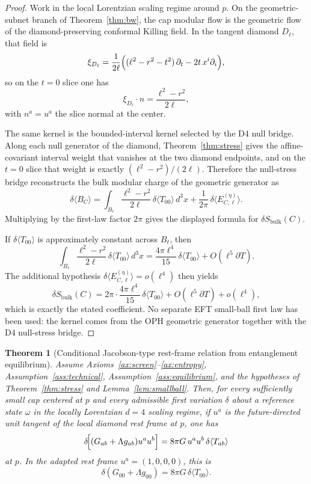 \documentclass[11pt]{article}
\newtheorem{theorem}{Theorem}[section]
\begin{document}
\begin{proof}
Work in the local Lorentzian scaling regime around $p$. On the geometric-subnet branch of Theorem~\ref{thm:bw}, the cap modular flow is the geometric flow of the diamond-preserving conformal Killing field. In the tangent diamond $D_\ell$, that field is
\[
\xi_{D_\ell}
=
\frac{1}{2\ell}
\Bigl((\ell^2-r^2-t^2)\,\partial_t-2t\,x^i\partial_i\Bigr),
\]
so on the $t=0$ slice one has
\[
\xi_{D_\ell}\!\cdot n=\frac{\ell^2-r^2}{2\ell},
\]
with $n^a=u^a$ the slice normal at the center.

The same kernel is the bounded-interval kernel selected by the D4 null bridge. Along each null generator of the diamond, Theorem~\ref{thm:stress} gives the affine-covariant interval weight that vanishes at the two diamond endpoints, and on the $t=0$ slice that weight is exactly $(\ell^2-r^2)/(2\ell)$. Therefore the null-stress bridge reconstructs the bulk modular charge of the geometric generator as
\[
\delta\langle B_C\rangle
=
\int_{B_\ell}\frac{\ell^2-r^2}{2\ell}\,\delta\langle T_{00}\rangle\,d^3x
+\frac{1}{2\pi}\,\delta\langle E^{(\eta)}_{C,\ell}\rangle.
\]
Multiplying by the first-law factor $2\pi$ gives the displayed formula for $\delta S_{\mathrm{bulk}}(C)$.

If $\delta\langle T_{00}\rangle$ is approximately constant across $B_\ell$, then
\[
\int_{B_\ell}\frac{\ell^2-r^2}{2\ell}\,\delta\langle T_{00}\rangle\,d^3x
=
\frac{4\pi\ell^4}{15}\,\delta\langle T_{00}\rangle
+O(\ell^5\partial T).
\]
\noindent
The additional hypothesis $\delta\langle E^{(\eta)}_{C,\ell}\rangle=o(\ell^4)$ then yields
\[
\delta S_{\mathrm{bulk}}(C)
=
2\pi\cdot\frac{4\pi\ell^4}{15}\,\delta\langle T_{00}\rangle
+O(\ell^5\partial T)+o(\ell^4),
\]
which is exactly the stated coefficient. No separate EFT small-ball first law has been used: the kernel comes from the OPH geometric generator together with the D4 null-stress bridge.
\end{proof}

\begin{theorem}[Conditional Jacobson-type rest-frame relation from entanglement equilibrium]\label{thm:einstein}
Assume Axioms~\ref{ax:screen}--\ref{ax:entropy}, Assumption~\ref{ass:technical}, Assumption~\ref{ass:equilibrium}, and the hypotheses of Theorem~\ref{thm:stress} and Lemma~\ref{lem:smallball}. Then, for every sufficiently small cap centered at $p$ and every admissible first variation $\delta$ about a reference state $\omega$ in the locally Lorentzian $d=4$ scaling regime, if $u^a$ is the future-directed unit tangent of the local diamond rest frame at $p$, one has
\[
\delta\!\Bigl[(G_{ab}+\Lambda g_{ab})u^a u^b\Bigr]
=
8\pi G\,u^a u^b\,\delta\langle T_{ab}\rangle
\]
at $p$. In the adapted rest frame $u^a=(1,0,0,0)$, this is
\[
\delta\!\left(G_{00}+\Lambda g_{00}\right)=8\pi G\,\delta\langle T_{00}\rangle.
\]
\end{theorem}
\end{document}
